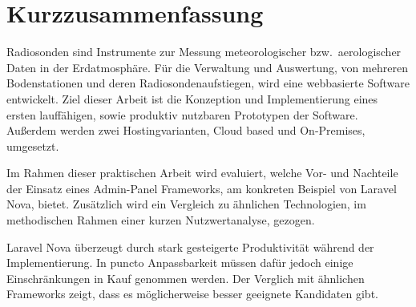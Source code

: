 \newpage


\section*{Kurzzusammenfassung}
Radiosonden sind Instrumente zur Messung meteorologischer bzw.\ aerologischer Daten in der Erdatmosphäre.
Für die Verwaltung und Auswertung, von mehreren Bodenstationen und deren Radiosondenaufstiegen, wird eine webbasierte Software entwickelt.
Ziel dieser Arbeit ist die Konzeption und Implementierung eines ersten lauffähigen, sowie produktiv nutzbaren Prototypen der Software.
Außerdem werden zwei Hostingvarianten, Cloud based und On-Premises, umgesetzt.

Im Rahmen dieser praktischen Arbeit wird evaluiert, welche Vor- und Nachteile der Einsatz eines Admin-Panel Frameworks, am konkreten Beispiel von Laravel Nova, bietet.
Zusätzlich wird ein Vergleich zu ähnlichen Technologien, im methodischen Rahmen einer kurzen Nutzwertanalyse, gezogen.

Laravel Nova überzeugt durch stark gesteigerte Produktivität während der Implementierung.
In puncto Anpassbarkeit müssen dafür jedoch einige Einschränkungen in Kauf genommen werden.
Der Verglich mit ähnlichen Frameworks zeigt, dass es möglicherweise besser geeignete Kandidaten gibt.

